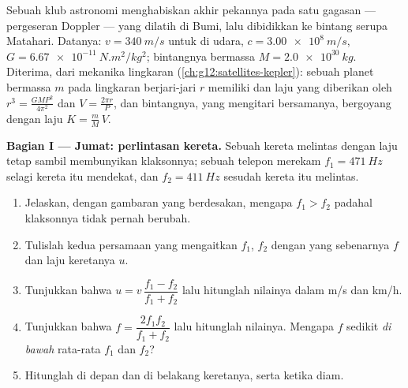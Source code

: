 \begin{problem}
\label{pb:g12:doppler-effect:1}
Sebuah klub astronomi menghabiskan akhir pekannya pada satu gagasan --- pergeseran Doppler
--- yang dilatih di Bumi, lalu dibidikkan ke bintang serupa Matahari. Datanya:
$v = \qty{340}{m/s}$ untuk  di udara, $c = \qty{3.00e8}{m/s}$,
$G = \qty{6.67e-11}{N.m^2/kg^2}$; bintangnya bermassa $M = \qty{2.0e30}{kg}$. Diterima,
dari mekanika  lingkaran (\cref{ch:g12:satellites-kepler}): sebuah planet bermassa $m$
pada  lingkaran berjari-jari $r$ memiliki  dan laju yang diberikan oleh
$r^3 = \frac{G M P^2}{4\pi^2}$ dan $V = \frac{2\pi r}{P}$, dan bintangnya, yang mengitari
 bersamanya, bergoyang dengan laju $K = \frac{m}{M}\,V$.

\medskip
\noindent\textbf{Bagian I --- Jumat: perlintasan kereta.}
Sebuah kereta melintas dengan laju tetap sambil membunyikan klaksonnya; sebuah telepon
merekam $f_1 = \qty{471}{Hz}$ selagi kereta itu mendekat, dan $f_2 = \qty{411}{Hz}$
sesudah kereta itu melintas.
\begin{enumerate}
  \item Jelaskan, dengan gambaran  yang berdesakan, mengapa $f_1 > f_2$
        padahal klaksonnya tidak pernah berubah.
  \item Tulislah kedua persamaan yang mengaitkan $f_1$, $f_2$ dengan  yang
        sebenarnya $f$ dan laju keretanya $u$.
  \item Tunjukkan bahwa $u = v\,\dfrac{f_1 - f_2}{f_1 + f_2}$ lalu hitunglah nilainya dalam
        \unit{m/s} dan \unit{km/h}.
  \item Tunjukkan bahwa $f = \dfrac{2 f_1 f_2}{f_1 + f_2}$ lalu hitunglah nilainya. Mengapa
        $f$ sedikit \emph{di bawah} rata-rata $f_1$ dan $f_2$?
  \item Hitunglah  di depan dan di belakang keretanya, serta  ketika diam.
\end{enumerate}


\end{problem}
